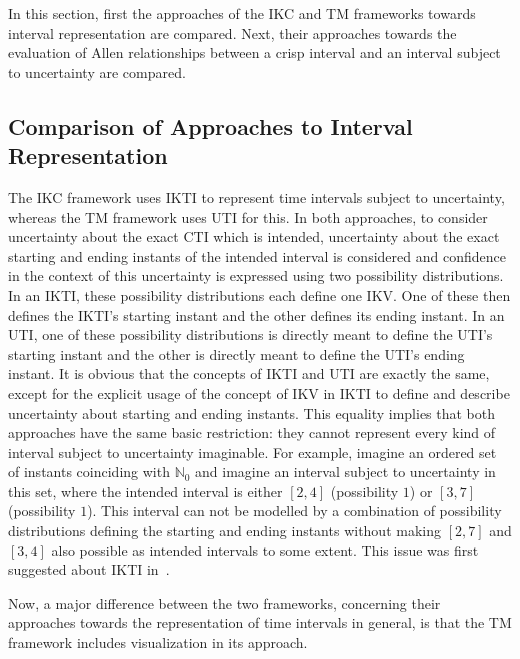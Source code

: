 In this section, first the approaches of the IKC and TM frameworks towards interval representation are compared. Next, their approaches towards the evaluation of Allen relationships between a crisp interval and an interval subject to uncertainty are compared.

\subsection{\label{subsec:comp-interval}Comparison of Approaches to Interval Representation}
The IKC framework uses IKTI to represent time intervals subject to uncertainty, whereas the TM framework uses UTI for this. In both approaches, to consider uncertainty about the exact CTI which is intended, uncertainty about the exact starting and ending instants of the intended interval is considered and confidence in the context of this uncertainty is expressed using two possibility distributions. In an IKTI, these possibility distributions each define one IKV. One of these then defines the IKTI's starting instant and the other defines its ending instant. In an UTI, one of these possibility distributions is directly meant to define the UTI's starting instant and the other is directly meant to define the UTI's ending instant. It is obvious that the concepts of IKTI and UTI are exactly the same, except for the explicit usage of the concept of IKV in IKTI to define and describe uncertainty about starting and ending instants. This equality implies that both approaches have the same basic restriction: they cannot represent every kind of interval subject to uncertainty imaginable. For example, imagine an ordered set of instants coinciding with $\mathbb{N}_0$ and imagine an interval subject to uncertainty in this set, where the intended interval is either $\left[2, 4\right]$ (possibility $1$) or $\left[3, 7\right]$ (possibility $1$). This interval can not be modelled by a combination of possibility distributions defining the starting and ending instants without making $\left[2, 7\right]$ and $\left[3, 4\right]$ also possible as intended intervals to some extent. This issue was first suggested about IKTI in~\cite{Billiet2012}.

Now, a major difference between the two frameworks, concerning their approaches towards the representation of time intervals in general, is that the TM framework includes visualization in its approach.

